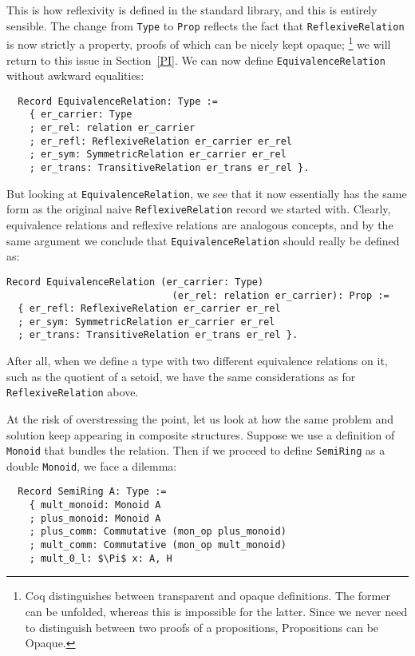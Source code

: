 \documentclass[a4paper,10pt,runningheads]{llncs}
\begin{document}
This is how reflexivity is defined in the standard library, and this is entirely sensible. The
change from \lstinline|Type| to \lstinline|Prop| reflects the fact that \lstinline|ReflexiveRelation| is now strictly a property,
proofs of which can be nicely kept opaque;%
\footnote{Coq distinguishes between transparent and opaque definitions. The former can be unfolded,
whereas this is impossible for the latter. Since we never need to distinguish between two proofs of
a propositions, Propositions can be Opaque.}
we will return to this issue in Section~\ref{PI}.
We can now define \lstinline|EquivalenceRelation| without awkward equalities:
\begin{lstlisting}
  Record EquivalenceRelation: Type :=
    { er_carrier: Type
    ; er_rel: relation er_carrier
    ; er_refl: ReflexiveRelation er_carrier er_rel
    ; er_sym: SymmetricRelation er_carrier er_rel
    ; er_trans: TransitiveRelation er_trans er_rel }.
\end{lstlisting}


But looking at \lstinline|EquivalenceRelation|, we see that it now essentially has the same form as the
original naive \lstinline|ReflexiveRelation| record we started with. Clearly, equivalence relations
and reflexive relations are analogous concepts, and by the same argument we
conclude that \lstinline|EquivalenceRelation| should really be defined as:

\begin{lstlisting}
Record EquivalenceRelation (er_carrier: Type)
                             (er_rel: relation er_carrier): Prop :=
  { er_refl: ReflexiveRelation er_carrier er_rel
  ; er_sym: SymmetricRelation er_carrier er_rel
  ; er_trans: TransitiveRelation er_trans er_rel }.
\end{lstlisting}


After all, when we define a type with
two different equivalence relations on it,
such as the quotient of a setoid,
we have the same considerations as for \lstinline|ReflexiveRelation| above.

At the risk of overstressing the point, let us look at how the same problem and solution keep
appearing in composite structures. Suppose we use a definition of \lstinline|Monoid| that bundles the
relation. Then if we proceed to define \lstinline|SemiRing| as a double \lstinline|Monoid|, we face a dilemma:
\begin{lstlisting}
  Record SemiRing A: Type :=
    { mult_monoid: Monoid A 
    ; plus_monoid: Monoid A 
    ; plus_comm: Commutative (mon_op plus_monoid)
    ; mult_comm: Commutative (mon_op mult_monoid)
    ; mult_0_l: $\Pi$ x: A, H
\end{lstlisting}
\end{document}
